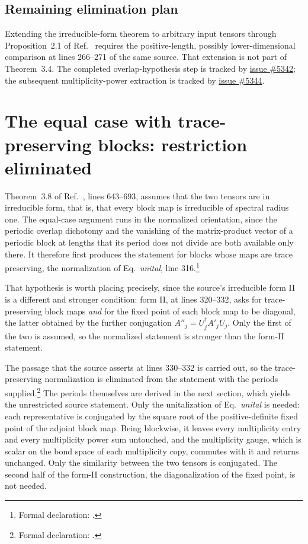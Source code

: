 \documentclass{article}
\begin{document}
\subsection{Remaining elimination plan}

Extending the irreducible-form theorem to arbitrary input tensors through
Proposition~2.1 of Ref.~\cite{DeLasCuevas2017Irreducible} requires the
positive-length, possibly lower-dimensional comparison at lines 266--271 of
the same source. That extension is not part of Theorem~3.4. The completed
overlap-hypothesis step is tracked by
\href{https://github.com/LionSR/TNLean/issues/5342}{issue \#5342}; the
subsequent multiplicity-power extraction is tracked by
\href{https://github.com/LionSR/TNLean/issues/5344}{issue \#5344}.

\section{The equal case with trace-preserving blocks: restriction eliminated}

Theorem~3.8 of Ref.~\cite{DeLasCuevas2017Irreducible}, lines 643--693, assumes
that the two tensors are in irreducible form, that is, that every block map is
irreducible of spectral radius one. The equal-case argument runs in the
normalized orientation, since the periodic overlap dichotomy and the vanishing
of the matrix-product vector of a periodic block at lengths that its period
does not divide are both available only there. It therefore first produces the
statement for blocks whose maps are trace preserving, the normalization of
Eq.~\emph{unital}, line 316.\footnote{Formal declaration:
.}

That hypothesis is worth placing precisely, since the source's irreducible form
II is a different and stronger condition: form II, at lines 320--332, asks for
trace-preserving block maps \emph{and} for the fixed point of each block map to
be diagonal, the latter obtained by the further conjugation
$A''_j = U_j^\dagger A'_j U_j$. Only the first of the two is assumed, so the
normalized statement is stronger than the form-II statement.

The passage that the source asserts at lines 330--332 is carried out, so the
trace-preserving normalization is eliminated from the statement with the
periods supplied.\footnote{Formal declaration:
.} The
periods themselves are derived in the next section, which yields the
unrestricted source statement. Only
the unitalization of Eq.~\emph{unital} is needed: each representative is
conjugated by the square root of the positive-definite fixed point of the
adjoint block map. Being blockwise, it leaves every multiplicity entry and
every multiplicity power sum untouched, and the multiplicity gauge, which is
scalar on the bond space of each multiplicity copy, commutes with it and
returns unchanged. Only the similarity between the two tensors is conjugated.
The second half of the form-II construction, the diagonalization of the fixed
point, is not needed.
\end{document}
